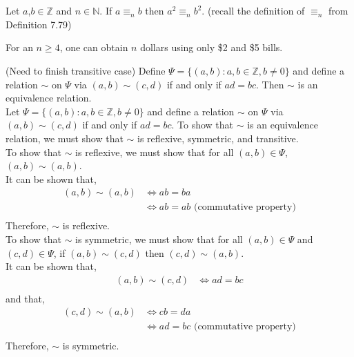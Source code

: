 \documentclass[12pt]{article}
\newenvironment{theorem}[2][Theorem]{\begin{trivlist}
\item[\hskip \labelsep {\bfseries #1}\hskip \labelsep {\bfseries #2.}]}{\end{trivlist}}
\begin{document}
\section{}
\begin{theorem}4
	Let $a$,$b \in \mathbb{Z}$ and $n \in \mathbb{N}$. If $a \equiv_n b$ then $a^2 \equiv_n b^2$. (recall the definition of $\equiv_n$ from Definition 7.79)
\end{theorem}
\begin{theorem}5
	For an $n \geq 4$, one can obtain $n$ dollars using only \$2 and \$5 bills.
\end{theorem}
\begin{theorem}6 (Need to finish transitive case)
	Define $\Psi = \{(a,b): a,b \in \mathbb{Z}, b\neq 0\}$ and define a relation $\sim$ on $\Psi$ via $(a,b) \sim (c,d)$ if and only if
	$ad=bc$. Then $\sim$ is an equivalence relation.\\

	Let $\Psi = \{(a,b): a,b \in \mathbb{Z}, b\neq 0\}$ and define a relation $\sim$ on $\Psi$ via $(a,b) \sim (c,d)$ if and only if
	$ad=bc$. To show that $\sim$ is an equivalence relation, we must show that $\sim$ is reflexive, symmetric, and transitive.\\

	To show that $\sim$ is reflexive, we must show that for all $(a,b) \in \Psi$, $(a,b) \sim (a,b)$.\\
	It can be shown that, 
	\begin{align*}
		(a,b) \sim (a,b) &\Leftrightarrow ab=ba\\
				 &\Leftrightarrow ab=ab \text{ (commutative property)}\\
	\end{align*}
	Therefore, $\sim$ is reflexive.\\

	To show that $\sim$ is symmetric, we must show that for all $(a,b) \in \Psi$ and $(c,d) \in \Psi$, if $(a,b) \sim (c,d)$ then $(c,d) \sim (a,b)$.\\
	It can be shown that,
	\begin{align*}
		(a,b) \sim (c,d) &\Leftrightarrow ad=bc\\
	\end{align*}
	and that,
	\begin{align*}
		(c,d) \sim (a,b) &\Leftrightarrow cb=da\\
				 &\Leftrightarrow ad=bc \text{ (commutative property)}\\
	\end{align*}
	Therefore, $\sim$ is symmetric.\\

\end{theorem}
		
\end{document}
